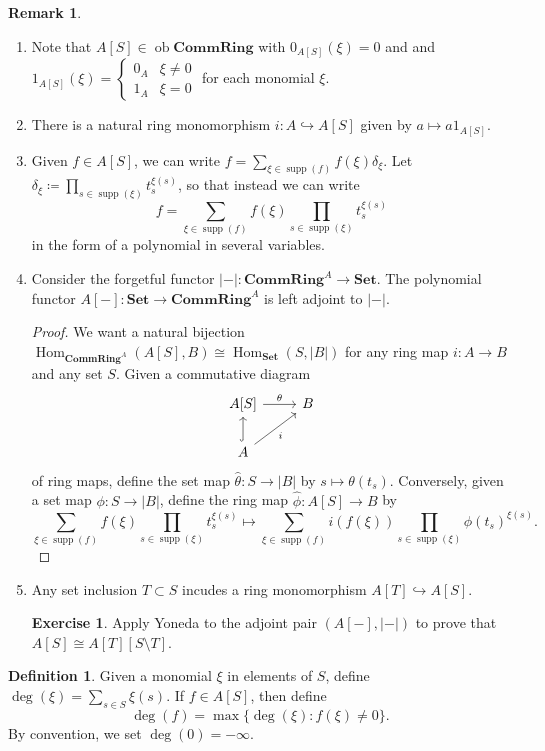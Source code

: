 \documentclass[10pt,letterpaper,cm]{nupset}
\theoremstyle{definition}
\newtheorem*{definition}{Definition}
\newtheorem{remark}{Remark}
\newtheorem{exercise}{Exercise}
\newcommand{\1}{\mathbf{1}}
\newcommand{\0}{\vec 0}
\DeclareMathOperator{\ob}{ob}
\DeclareMathOperator{\Hom}{Hom}
\DeclareMathOperator{\supp}{supp}
\begin{document}
\begin{remark} $ $
\begin{enumerate}
\item Note that $A[S] \in  \ob \mathbf{CommRing}$ with $0_{A[S]}(\xi) =0$ and and $1_{A[S]}(\xi) = \begin{cases} 0_A & \xi \ne 0 \\ 1_A & \xi =0   \end{cases}$ for each monomial $\xi$. 
\item There is  a natural ring monomorphism $i : A \hookrightarrow A[S]$ given by $a \mapsto a1_{A[S]}$.
\item Given $f\in A[S]$, we can write $f = \sum_{\xi \in \supp(f)} f(\xi)\delta_{\xi}$. Let $ \delta_{\xi}\coloneqq \prod_{s\in \supp(\xi)}t_s^{\xi(s)}$, so that instead we can write $$ f = \sum_{\xi \in \supp(f)} f(\xi)\prod_{s\in \supp(\xi)}t_s^{\xi(s)} $$ in the form of a polynomial in several variables.  
\item Consider the forgetful functor $\lvert - \rvert: \mathbf{CommRing}^A \to \mathbf{Set}$. The polynomial functor $A[-]: \mathbf{Set} \to \mathbf{CommRing}^A $ is left adjoint to $\lvert - \rvert$.
\begin{proof}
We want a natural bijection $\Hom_{\mathbf{CommRing}^A}(A[S], B) \cong \Hom_{\mathbf{Set}}(S, |B|)$ for any ring map $i: A\to B$ and any set $S$. Given a commutative diagram  
\[
\begin{tikzcd}
{A[S]} \arrow[r, "\theta"] & B \\
A \arrow[u, hook] \arrow[ru, "i"'] & 
\end{tikzcd}
\] of ring maps, define the set map $\hat{\theta} : S \to |B|$ by $s\mapsto \theta(t_s)$. Conversely, given a set map $\phi : S\to |B|$, define the ring map $\hat{\phi} : A[S] \to B$ by $$ \sum_{\xi \in \supp(f)} f(\xi)\prod_{s\in \supp(\xi)}t_s^{\xi(s)}  \mapsto \sum_{\xi \in \supp(f)} i(f(\xi))\prod_{s\in \supp(\xi)}\phi(t_s)^{\xi(s)}  .$$
\end{proof}
\item Any set inclusion $T \subset S$ incudes a ring monomorphism $A[T] \hookrightarrow A[S]$.
\begin{exercise}
Apply Yoneda to the adjoint pair $(A[-], \lvert - \rvert)$ to prove that $A[S]\cong A[T][S\setminus T]$.
\end{exercise}
\end{enumerate}
\end{remark}

\begin{definition}
Given a monomial $\xi$ in elements of $S$, define $\deg(\xi) = \sum_{s\in S} \xi(s).$ If $f\in A[S]$, then define $$ \deg(f)  = \max \{ \deg (\xi) : f(\xi) \ne 0\}  .$$ By convention, we set $\deg(0) = {-}\infty$.
\end{definition}
\end{document}
